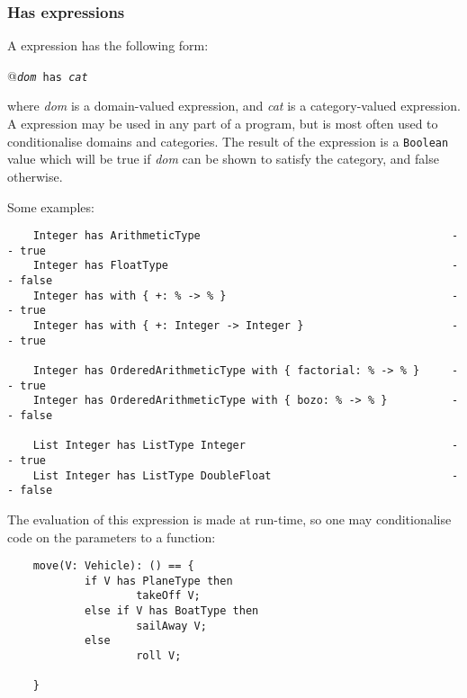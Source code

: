 {\goodbreak
\subsubsection{Has expressions}

A  expression has the following form:

\verb@    @{\tt {\em dom} has {\em cat}}

where {\em dom} is a domain-valued expression, and {\em cat} is a
category-valued
expression. A  expression may be used in any part of a
program, but is most often used to conditionalise domains and
categories. The result of the expression is a {\tt Boolean} value
which will be true if {\em dom} can be shown to satisfy the category,
and false otherwise.

Some examples:

\begin{small}
\begin{verbatim}
    Integer has ArithmeticType                                       -- true
    Integer has FloatType                                            -- false
    Integer has with { +: % -> % }                                   -- true
    Integer has with { +: Integer -> Integer }                       -- true

    Integer has OrderedArithmeticType with { factorial: % -> % }     -- true
    Integer has OrderedArithmeticType with { bozo: % -> % }          -- false

    List Integer has ListType Integer                                -- true
    List Integer has ListType DoubleFloat                            -- false
\end{verbatim}
\end{small}

The evaluation of this expression is made at run-time, so one may
conditionalise code on the parameters to a function:

\begin{small}
\begin{verbatim}
    move(V: Vehicle): () == {
            if V has PlaneType then
                    takeOff V;
            else if V has BoatType then
                    sailAway V;
            else
                    roll V;

    }
\end{verbatim}
\end{small}

}
